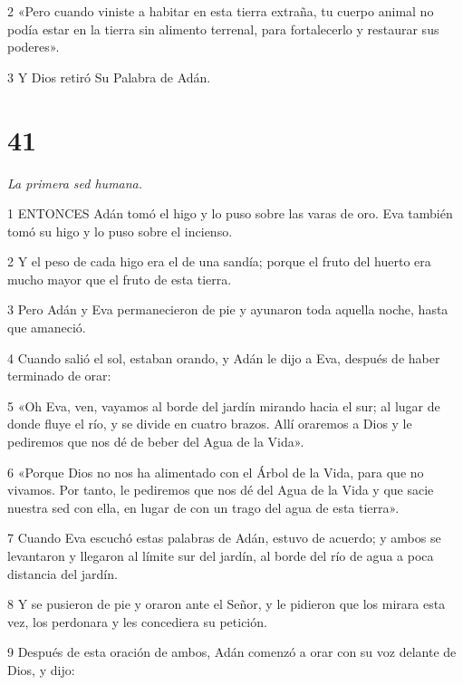\par 2 «Pero cuando viniste a habitar en esta tierra extraña, tu cuerpo animal no podía estar en la tierra sin alimento terrenal, para fortalecerlo y restaurar sus poderes».

\par 3 Y Dios retiró Su Palabra de Adán.

\chapter{41}

\par \textit{La primera sed humana.}

\par 1 ENTONCES Adán tomó el higo y lo puso sobre las varas de oro. Eva también tomó su higo y lo puso sobre el incienso.

\par 2 Y el peso de cada higo era el de una sandía; porque el fruto del huerto era mucho mayor que el fruto de esta tierra.

\par 3 Pero Adán y Eva permanecieron de pie y ayunaron toda aquella noche, hasta que amaneció.

\par 4 Cuando salió el sol, estaban orando, y Adán le dijo a Eva, después de haber terminado de orar:

\par 5 «Oh Eva, ven, vayamos al borde del jardín mirando hacia el sur; al lugar de donde fluye el río, y se divide en cuatro brazos. Allí oraremos a Dios y le pediremos que nos dé de beber del Agua de la Vida».

\par 6 «Porque Dios no nos ha alimentado con el Árbol de la Vida, para que no vivamos. Por tanto, le pediremos que nos dé del Agua de la Vida y que sacie nuestra sed con ella, en lugar de con un trago del agua de esta tierra».

\par 7 Cuando Eva escuchó estas palabras de Adán, estuvo de acuerdo; y ambos se levantaron y llegaron al límite sur del jardín, al borde del río de agua a poca distancia del jardín.

\par 8 Y se pusieron de pie y oraron ante el Señor, y le pidieron que los mirara esta vez, los perdonara y les concediera su petición.

\par 9 Después de esta oración de ambos, Adán comenzó a orar con su voz delante de Dios, y dijo:


